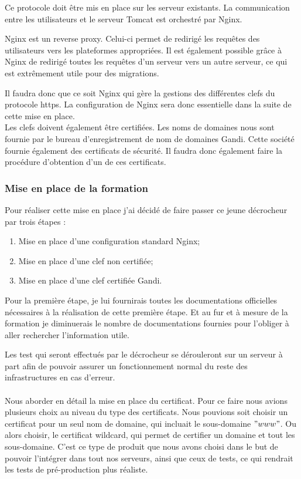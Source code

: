 Ce protocole doit être mis en place sur les serveur existants. La communication entre les utilisateurs et le serveur Tomcat est orchestré par Nginx.

Nginx est un reverse proxy. Celui-ci permet de redirigé les requêtes des utilisateurs vers les plateformes appropriées. Il est également possible grâce à Nginx de redirigé toutes les requêtes d'un serveur vers un autre serveur, ce qui est extrêmement utile pour des migrations.

Il faudra donc que ce soit Nginx qui gère la gestions des différentes clefs du protocole https. La configuration de Nginx sera donc essentielle dans la suite de cette mise en place.\\

Les clefs doivent également être certifiées. Les noms de domaines nous sont fournie par le bureau d'enregistrement de nom de domaines Gandi. Cette société fournie également des certificats de sécurité. Il faudra donc également faire la procédure d'obtention d'un de ces certificats.

\subsubsection{Mise en place de la formation}

Pour réaliser cette mise en place j'ai décidé de faire passer ce jeune décrocheur par trois étapes :

\begin{enumerate}
	\item Mise en place d'une configuration standard Nginx;
	\item Mise en place d'une clef non certifiée;
	\item Mise en place d'une clef certifiée Gandi.
\end{enumerate}

Pour la première étape, je lui fournirais toutes les documentations officielles nécessaires à la réalisation de cette première étape. Et au fur et à mesure de la formation je diminuerais le nombre de documentations fournies pour l'obliger à aller rechercher l'information utile.

Les test qui seront effectués par le décrocheur se dérouleront sur un serveur à part afin de pouvoir assurer un fonctionnement normal du reste des infrastructures en cas d'erreur.\\\\

Nous aborder en détail la mise en place du certificat. Pour ce faire nous avions plusieurs choix au niveau du type des certificats. Nous pouvions soit choisir un certificat pour un seul nom de domaine, qui incluait le sous-domaine $"www"$. Ou alors choisir, le certificat wildcard, qui permet de certifier un domaine et tout les sous-domaine. C'est ce type de produit que nous avons choisi dans le but de pouvoir l'intégrer dans tout nos serveurs, ainsi que ceux de tests, ce qui rendrait les tests de pré-production plus réaliste.

